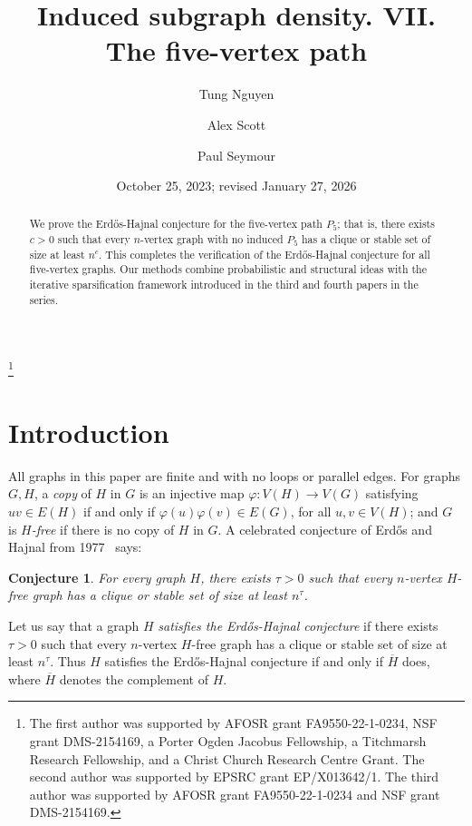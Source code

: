 \documentclass[11pt,reqno,a4paper]{amsart}
\date{October 25, 2023; revised January 27, 2026}
\newtheorem{conjecture}[theorem]{Conjecture}
\newcommand{\erh}{Erd\H{o}s-Hajnal}
\begin{document}
	\title{Induced subgraph density. VII. The five-vertex path}
	\author{Tung Nguyen}
	\address{Princeton University, Princeton, NJ 08544, USA}
	\author{Alex Scott}
	\address{Mathematical Institute,
		University of Oxford,
		Oxford OX2 6GG, UK}
	\author{Paul Seymour}
	\address{Princeton University, Princeton, NJ 08544, USA}
	\thanks{The first author was supported by AFOSR grant FA9550-22-1-0234, NSF grant DMS-2154169, a Porter Ogden Jacobus Fellowship, a Titchmarsh Research Fellowship, and a Christ Church Research Centre Grant.
		The second author was supported by EPSRC grant EP/X013642/1.
		The third author was supported by AFOSR grant FA9550-22-1-0234 and NSF grant DMS-2154169.}
	\begin{abstract}
		We prove the \erh{} conjecture for the five-vertex path $P_5$; that is, there exists $c>0$ such that every $n$-vertex graph with no induced $P_5$ has a clique or stable set of size at least $n^c$.
		This completes the verification of the \erh{} conjecture for all five-vertex graphs.
		Our methods combine probabilistic and structural ideas with the iterative sparsification framework introduced in the third and fourth papers in the series.
	\end{abstract}
	\maketitle
	\section{Introduction}
	All graphs in this paper are finite and with no loops or parallel edges.
	For graphs $G,H$, a {\em copy} of $H$ in $G$ is an injective map $\varphi\colon V(H)\to V(G)$ satisfying $uv\in E(H)$ if and only if $\varphi(u)\varphi(v)\in E(G)$, for all $u,v\in V(H)$;
	and $G$ is {\em $H$-free} if there is no copy of $H$ in $G$.
	A celebrated conjecture of Erd\H{o}s and Hajnal from 1977~\cite{MR599767, MR1031262} says:
	\begin{conjecture}
		\label{conj:eh}
		For every graph $H$, there exists $\tau>0$ such that every $n$-vertex $H$-free graph has a clique or stable set of size at least $n^\tau$.
	\end{conjecture}
	Let us say that a graph $H$ {\em satisfies the \erh{} conjecture} if there exists $\tau>0$ such that every $n$-vertex $H$-free graph has a clique or stable set of size at least $n^\tau$. 
	Thus $H$ satisfies the \erh{} conjecture if and only if $\overline H$ does, where $\overline H$ denotes the complement of $H$.
	
\end{document}
